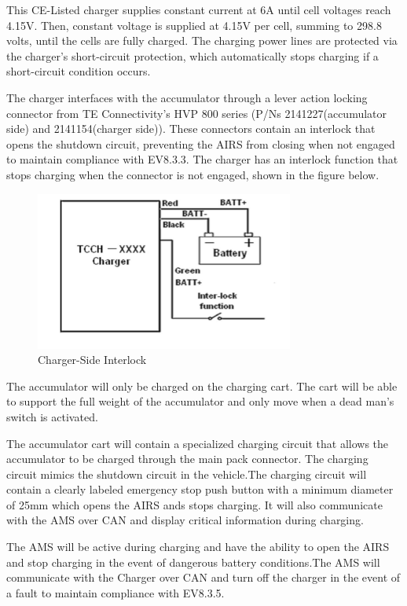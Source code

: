 \documentclass{article}
\begin{document}
	This CE-Listed charger supplies constant current at 6A until cell voltages reach 4.15V. Then, constant voltage is supplied at 4.15V per cell, summing to 298.8 volts, until the cells are fully charged. The charging power lines are protected via the charger's short-circuit protection, which automatically stops charging if a short-circuit condition occurs.
	
	The charger interfaces with the accumulator through a lever action locking connector from TE Connectivity's HVP 800 series (P/Ns 2141227(accumulator side) and 2141154(charger side)). These connectors contain an interlock that opens the shutdown circuit, preventing the AIRS from closing when not engaged to maintain compliance with EV8.3.3. The charger has an interlock function that stops charging when the connector is not engaged, shown in the figure below.
	
	 \begin{figure}[H]
		\centering
		\includegraphics[width = 0.4 \textwidth]{charger_interlock.png}
		\caption{Charger-Side Interlock}
		\label{fig:ChargerInterlock}
	\end{figure}
	
	
	The accumulator will only be charged on the charging cart. The cart will be able to support the full weight of the accumulator and only move when a dead man's switch is activated.
	
	The accumulator cart will contain a specialized charging circuit that allows the accumulator to be charged through the main pack connector. The charging circuit mimics the shutdown circuit in the vehicle.The charging circuit will contain a clearly labeled emergency stop push button with a minimum diameter of 25mm which opens the AIRS ands stops charging. It will also communicate with the AMS over CAN and display critical information during charging.
	
	The AMS will be active during charging and have the ability to open the AIRS and stop charging in the event of dangerous battery conditions.The AMS will communicate with the Charger over CAN and turn off the charger in the event of a fault to maintain compliance with EV8.3.5. 
	
\end{document}
